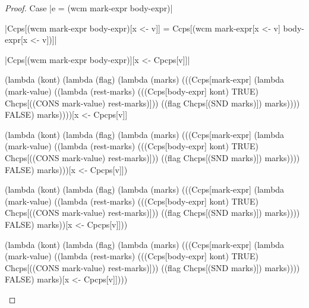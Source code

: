 \begin{proof}{Case \scheme|e = (wcm mark-expr body-expr)|}

\noindent
\scheme|Ccps[(wcm mark-expr body-expr)[x <- v]] = Ccps[(wcm mark-expr[x <- v] body-expr[x <- v])]|

\noindent
\scheme|Ccps[(wcm mark-expr body-expr)][x <- Cpcps[v]]|

\begin{schemeblock}
\begin{schemedisplay}
(lambda (kont)
  (lambda (flag)
    (lambda (marks)
      (((Ccps[mark-expr]
          (lambda (mark-value) 
            ((lambda (rest-marks) 
               (((Ccps[body-expr] kont) TRUE) Chcps[((CONS mark-value) rest-marks)]))
             ((flag Chcps[(SND marks)]) marks))))
        FALSE) marks))))[x <- Cpcps[v]]
\end{schemedisplay}
\end{schemeblock}

\begin{schemeblock}
\begin{schemedisplay}
(lambda (kont)
  (lambda (flag)
    (lambda (marks)
      (((Ccps[mark-expr]
          (lambda (mark-value) 
            ((lambda (rest-marks) 
               (((Ccps[body-expr] kont) TRUE) Chcps[((CONS mark-value) rest-marks)]))
             ((flag Chcps[(SND marks)]) marks))))
        FALSE) marks)))[x <- Cpcps[v]])
\end{schemedisplay}
\end{schemeblock}

\begin{schemeblock}
\begin{schemedisplay}
(lambda (kont)
  (lambda (flag)
    (lambda (marks)
      (((Ccps[mark-expr]
          (lambda (mark-value) 
            ((lambda (rest-marks) 
               (((Ccps[body-expr] kont) TRUE) Chcps[((CONS mark-value) rest-marks)]))
             ((flag Chcps[(SND marks)]) marks))))
        FALSE) marks))[x <- Cpcps[v]]))
\end{schemedisplay}
\end{schemeblock}

\begin{schemeblock}
\begin{schemedisplay}
(lambda (kont)
  (lambda (flag)
    (lambda (marks)
      (((Ccps[mark-expr]
          (lambda (mark-value) 
            ((lambda (rest-marks) 
               (((Ccps[body-expr] kont) TRUE) Chcps[((CONS mark-value) rest-marks)]))
             ((flag Chcps[(SND marks)]) marks))))
        FALSE) marks)[x <- Cpcps[v]])))
\end{schemedisplay}
\end{schemeblock}


\end{proof}

